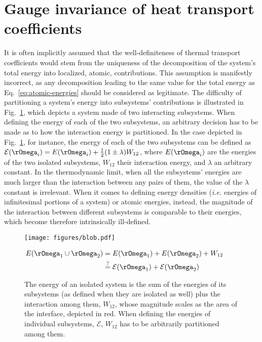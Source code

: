 \section{Gauge invariance of heat transport coefficients} \label{sec:gauge-invariance} It is often implicitly assumed that the well-definiteness of thermal transport coefficients would stem from the uniqueness of the decomposition of the system's total energy into localized, atomic, contributions. This assumption is manifestly incorrect, as any decomposition leading to the same value for the total energy as Eq.~\eqref{eq:atomic-energies} should be considered as legitimate. The difficulty of partitioning a system's energy into subsystems' contributions is illustrated in Fig.~\ref{fig:energy-partition}, which depicts a system made of two interacting subsystems. When defining the energy of each of the two subsystems, an arbitrary decision has to be made as to how the interaction energy is partitioned. In the case depicted in Fig.~\ref{fig:energy-partition}, for instance, the energy of each of the two subsystems can be defined as $\mathcal{E}(\rOmega_i) = E(\rOmega_i) + \frac{1}{2}(1\pm\lambda)W_{12}$, where $E(\rOmega_i)$ are the energies of the two isolated subsystems, $W_{12}$ their interaction energy, and $\lambda$ an arbitrary constant. In the thermodynamic limit, when all the subsystems' energies are much larger than the interaction between any pairs of them, the value of the $\lambda$ constant is irrelevant. When it comes to defining energy densities (\emph{i.e.} energies of infinitesimal portions of a system) or atomic energies, instead, the magnitude of the interaction between different subsystems is comparable to their energies, which become therefore intrinsically ill-defined.

\begin{figure}
\begin{minipage}{0.5\textwidth}
\centering \texttt{[image: figures/blob.pdf]}
\end{minipage}
\begin{minipage}{0.4\textwidth}
\begin{align*}
  E(\rOmega_{1}\cup\rOmega_2) &= E(\rOmega_1) + E(\rOmega_2) + W_{12} \qquad \\
  & \overset{?}{=}\mathcal{E}(\rOmega_1)+\mathcal{E}(\rOmega_2)
\end{align*}
\end{minipage}
\caption{
	The energy of an isolated system is the sum of the energies of its subsystems (as defined when they are isolated as well) plus the interaction among them, $W_{12}$, whose magnitude scales as the area of the interface, depicted in red. When defining the energies of individual subsystems, $\mathcal{E}$, $W_{12}$ has to be arbitrarily partitioned among them. \label{fig:energy-partition}}
\end{figure}

